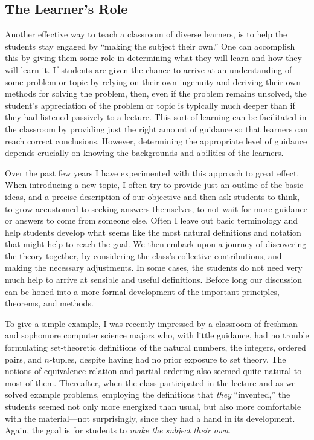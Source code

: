 \subsection{The Learner's Role} Another effective way to teach a classroom of diverse learners, is to help the students stay engaged by ``making the subject their own.''  One can accomplish this by giving them some role in determining what they will learn and how they will learn it.  If students are given the chance to arrive at an understanding of some problem or topic by relying on their own ingenuity and deriving their own methods for solving the problem, then, even if the problem remains unsolved, the student's appreciation of the problem or topic is typically much deeper than if they had listened passively to a lecture. This sort of learning can be facilitated in the classroom by providing just the right amount of guidance so that learners can reach correct conclusions.  However, determining the appropriate level of guidance depends crucially on knowing the backgrounds and abilities of the learners.

Over the past few years I have experimented with this approach to great effect.  When introducing a new topic, I often try to provide just an outline of the basic ideas, and a precise description of our objective and then ask students to think, to grow accustomed to seeking answers themselves, to not wait for more guidance or answers to come from someone else. Often I leave out basic terminology and help students develop what seems like the most natural definitions and notation that might help to reach the goal. We then embark upon a journey of discovering the theory together, by considering the class's collective contributions, and making the necessary adjustments. In some cases, the students do not need very much help to arrive at sensible and useful definitions. Before long our discussion can be honed into a more formal development of the important principles, theorems, and methods.

To give a simple example, I was recently impressed by a classroom of freshman and sophomore computer science majors who, with little guidance, had no trouble formulating set-theoretic definitions of the natural numbers, the integers, ordered pairs, and $n$-tuples, despite having had no prior exposure to set theory. The notions of equivalence relation and partial ordering also seemed quite natural to most of them. Thereafter, when the class participated in the lecture and as we solved example problems, employing the definitions that \emph{they} ``invented,'' the students seemed not only more energized than usual, but also more comfortable with the material---not surprisingly, since they had a hand in its development. Again, the goal is for students to \emph{make the subject their own}.  

